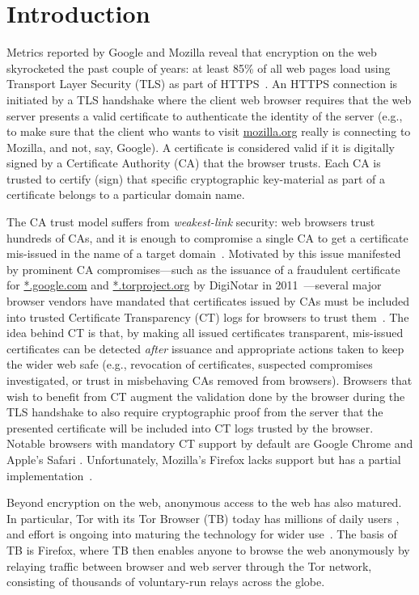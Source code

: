 \section{Introduction} \label{sec:introduction}
Metrics reported by Google and Mozilla reveal that encryption on the web
skyrocketed the past couple of years: at least 85\% of all web pages load using
Transport Layer Security (TLS) as part of
HTTPS~\cite{google-metrics,mozilla-metrics}. An HTTPS connection is initiated by
a TLS handshake where the client web browser requires that the web server
presents a valid certificate to authenticate the identity of the server (e.g.,
to make sure that the client who wants to visit \url{mozilla.org} really is
connecting to Mozilla, and not, say, Google). A certificate is considered valid
if it is digitally signed by a Certificate Authority (CA) that the browser
trusts. Each CA is trusted to certify (sign) that specific cryptographic
key-material as part of a certificate belongs to a particular domain name.

The CA trust model suffers from \emph{weakest-link} security: web browsers trust
hundreds of CAs, and it is enough to compromise a single CA to get a certificate
mis-issued in the name of a target domain~\cite{ca-ecosystem,https-sok}.
Motivated by this issue manifested by prominent CA compromises---such as the
issuance of a fraudulent certificate for \url{*.google.com} and
\url{*.torproject.org} by DigiNotar in 2011~\cite{diginotar}---several major
browser vendors have mandated that certificates issued by CAs must be included
into trusted Certificate Transparency (CT) logs for browsers to trust
them~\cite{ct/a,ct,ct/bis}. The idea behind CT is that, by making all issued
certificates transparent, mis-issued certificates can be detected \emph{after}
issuance and appropriate actions taken to keep the wider web safe (e.g.,
revocation of certificates, suspected compromises investigated, or trust in
misbehaving CAs removed from browsers). Browsers that wish to benefit from CT
augment the validation done by the browser during the TLS handshake to also
require cryptographic proof from the server that the presented certificate will
be included into CT logs trusted by the browser. Notable browsers with mandatory
CT support by default are Google Chrome and Apple's Safari
\cite{chrome-policy,safari-policy}. Unfortunately, Mozilla's Firefox lacks
support but has a partial implementation~\cite{ffct}.

Beyond encryption on the web, anonymous access to the web has also matured. In
particular, Tor with its Tor Browser (TB) today has millions of daily users
\cite{tor,mani}, and effort is ongoing into maturing the technology for wider
use~\cite{fftor}. The basis of TB is Firefox, where TB then enables anyone to
browse the web anonymously by relaying traffic between browser and web server
through the Tor network, consisting of thousands of voluntary-run relays across
the globe. 

